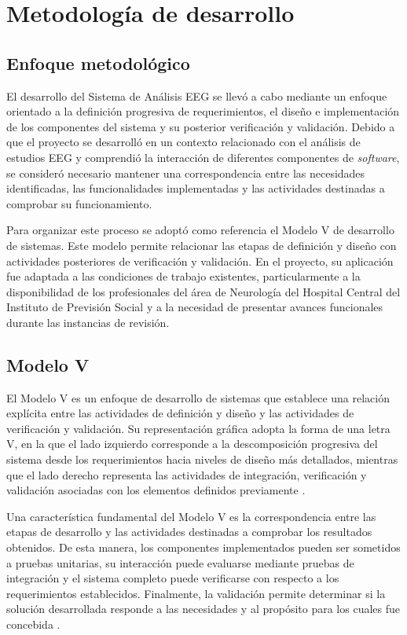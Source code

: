 \chapter{Metodología de desarrollo}
\label{cap:metodologia}

\section{Enfoque metodológico}
\label{sec:enfoque-metodologico}

El desarrollo del Sistema de Análisis EEG se llevó a cabo mediante un enfoque orientado a la
definición progresiva de requerimientos, el diseño e implementación de los
componentes del sistema y su posterior verificación y validación. Debido a que el proyecto se desarrolló en un contexto relacionado con el análisis de estudios EEG y comprendió la interacción de
diferentes componentes de \textit{software}, se consideró necesario mantener una correspondencia entre las necesidades identificadas, las funcionalidades implementadas y las actividades destinadas
a comprobar su funcionamiento.

Para organizar este proceso se adoptó como referencia el Modelo V de desarrollo
de sistemas. Este modelo permite relacionar las etapas de definición y diseño
con actividades posteriores de verificación y validación. En el proyecto, su
aplicación fue adaptada a las condiciones de trabajo existentes, particularmente
a la disponibilidad de los profesionales del área de Neurología del Hospital
Central del Instituto de Previsión Social y a la necesidad de presentar avances
funcionales durante las instancias de revisión.

\section{Modelo V}
\label{sec:modelo-v}

El Modelo V es un enfoque de desarrollo de sistemas que establece una relación
explícita entre las actividades de definición y diseño y las actividades de
verificación y validación. Su representación gráfica adopta la forma de una
letra V, en la que el lado izquierdo corresponde a la descomposición progresiva
del sistema desde los requerimientos hacia niveles de diseño más detallados,
mientras que el lado derecho representa las actividades de integración,
verificación y validación asociadas con los elementos definidos previamente
\citep{ForsbergMooz1991}.

Una característica fundamental del Modelo V es la correspondencia entre las
etapas de desarrollo y las actividades destinadas a comprobar los resultados
obtenidos. De esta manera, los componentes implementados pueden ser sometidos
a pruebas unitarias, su interacción puede evaluarse mediante pruebas de
integración y el sistema completo puede verificarse con respecto a los
requerimientos establecidos. Finalmente, la validación permite determinar si
la solución desarrollada responde a las necesidades y al propósito para los
cuales fue concebida \citep{ForsbergMooz1991}.

